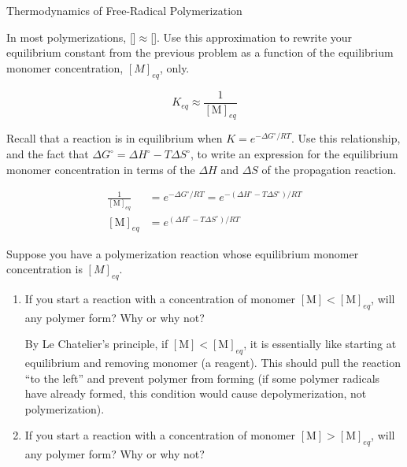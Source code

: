 \begin{activity}{Thermodynamics of Free-Radical Polymerization}
\begin{ctqs}
	\question In most polymerizations, []$\approx$[].  Use this approximation to rewrite your equilibrium constant from the previous problem as a function of the equilibrium monomer concentration, $[M]_{eq}$, only.
				
				\begin{solution}[0.5in]{}
					\begin{equation*}
						K_{eq}\approx \frac{1}{[\text{M}]_{eq}}
					\end{equation*}
				\end{solution}
	
	\question Recall that a reaction is in equilibrium when $K = e^{-\Delta G^\circ/RT}$.  Use this relationship, and the fact that $\Delta G^\circ = \Delta H^\circ - T\Delta S^\circ$, to write an  expression for the equilibrium monomer concentration in terms of the $\Delta H$ and $\Delta S$ of the propagation reaction. \label{\labelbase:ctq:Meq}
				
				\begin{solution}[1in]{}
					\begin{align*}
						\frac{1}{[\text{M}]_{eq}} &= e^{-\Delta G^\circ/RT} = e^{-(\Delta H^\circ - T\Delta S^\circ)/RT}\\
						[\text{M}]_{eq} &= e^{(\Delta H^\circ - T\Delta S^\circ)/RT}
					\end{align*}
				\end{solution}
	
	\question Suppose you have a polymerization reaction whose equilibrium monomer concentration is $[M]_{eq}$.  
		\begin{enumerate}
			\item If you start a reaction with a concentration of monomer $[\text{M}] < [\text{M}]_{eq}$, will any polymer form?  Why or why not?
				
				\begin{solution}[1in]{}
					By Le Chatelier's principle, if $[\text{M}] < [\text{M}]_{eq}$, it is essentially like starting at equilibrium and removing monomer (a reagent).  This should pull the reaction ``to the left'' and prevent polymer from forming (if some polymer radicals have already formed, this condition would cause depolymerization, not polymerization).
				\end{solution}
				
			\item If you start a reaction with a concentration of monomer $[\text{M}] > [\text{M}]_{eq}$, will any polymer form?  Why or why not?
				

\end{enumerate}
\end{ctqs}
\end{activity}

